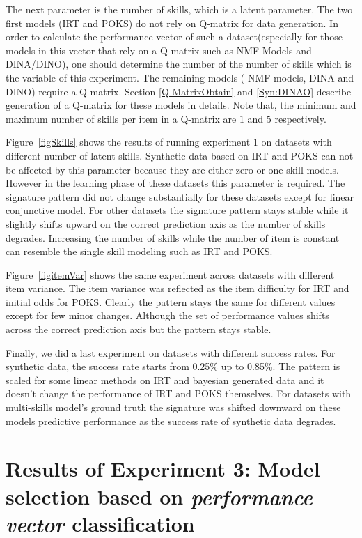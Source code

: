 The next parameter is the number of skills, which is a latent parameter. The two first models (IRT and POKS) do not rely on Q-matrix for data generation. In order to calculate the performance vector of such a dataset(especially for those models in this vector that rely on a Q-matrix such as NMF Models and DINA/DINO), one should determine the number of the number of skills which is the variable of this experiment. The remaining models ( NMF models, DINA and DINO) require a Q-matrix. Section \ref{Q-MatrixObtain} and \ref{Syn:DINAO} describe generation of a Q-matrix for these models in details. Note that, the minimum and maximum number of skills per item in a Q-matrix are $1$ and $5$ respectively.


Figure~\ref{figSkills} shows the results of running experiment 1 on datasets with different number of latent skills. Synthetic data based on IRT and POKS can not be affected by this parameter because they are either zero or one skill models. However in the learning phase of these datasets this parameter is required. The signature pattern did not change substantially for these datasets except for linear conjunctive model. For other datasets the signature pattern stays stable while it slightly shifts upward on the correct prediction axis as the number of skills degrades. Increasing the number of skills while the number of item is constant can resemble the single skill modeling such as IRT and POKS. 

Figure~\ref{figitemVar} shows the same experiment across datasets with different item variance. The item variance was reflected as the item difficulty for IRT and initial odds for POKS. Clearly the pattern stays the same for different values except for few minor changes. Although the set of performance values shifts across the correct prediction axis but the pattern stays stable.

Finally, we did a last experiment on datasets with different success rates. For synthetic data, the success rate starts from 0.25\% up to 0.85\%. The pattern is scaled for some linear methods on IRT and bayesian generated data and it doesn't change the performance of IRT and POKS themselves. For datasets with multi-skills model's ground truth the signature was shifted downward on these models predictive performance as the success rate of synthetic data degrades.

\section{Results of Experiment 3: Model selection based on \textit{performance vector} classification}
 
